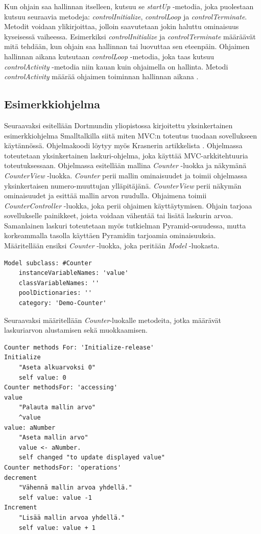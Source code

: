 \documentclass[finnish,utf8,nonumbib,palatino,kandi]{gradu2}
\begin{document}
Kun ohjain saa hallinnan itselleen, kutsuu se \emph{startUp} -metodia, joka puolestaan kutsuu seuraavia metodeja: \emph{controlInitialize}, \emph{controlLoop} ja \emph{controlTerminate}. Metodit
voidaan ylikirjoittaa, jolloin saavutetaan jokin haluttu ominaisuus kyseisessä vaiheessa. Esimerkiksi \emph{controlInitialize} ja \emph{controlTerminate} määräävät mitä tehdään, kun ohjain saa hallinnan tai luovuttaa sen eteenpäin. Ohjaimen hallinnan aikana kutsutaan
\emph{controlLoop} -metodia, joka taas kutsuu \emph{controlActivity} -metodia niin kauan kuin ohjaimella on hallinta.  Metodi \emph{controlActivity} määrää ohjaimen toiminnan hallinnan aikana \cite[s. 9]{Krasner:desc}.

\subsection{Esimerkkiohjelma}
Seuraavaksi esitellään  Dortmundin yliopistossa kirjoitettu yksinkertainen esimerkkiohjelma Smalltalkilla siitä miten MVC:n toteutus tuodaan sovellukseen käytännössä. Ohjelmakoodi löytyy myös Krasnerin artikkelista \cite[s. 20]{Krasner:desc}. Ohjelmassa toteutetaan yksinkertainen laskuri-ohjelma, joka käyttää MVC-arkkitehtuuria toteutuksessaan. Ohjelmassa esitellään mallina \emph{Counter} -luokka ja näkymänä \emph{CounterView} -luokka. \emph{Counter} perii mallin ominaisuudet ja
toimii ohjelmassa yksinkertaisen numero-muuttujan ylläpitäjänä. \emph{CounterView} perii näkymän ominaisuudet ja esittää mallin arvon ruudulla.
Ohjaimena toimii \emph{CounterController} -luokka, joka perii ohjaimen käyttäytymisen. Ohjain tarjoaa sovellukselle painikkeet, joista voidaan vähentää
tai lisätä laskurin arvoa. Samanlainen laskuri toteutetaan myös tutkielman Pyramid-osuudessa, mutta korkeammalla tasolla käyttäen Pyramidin tarjoamia ominaisuuksia.\\

Määritellään ensiksi \emph{Counter} -luokka, joka peritään \emph{Model} -luokasta.
\begin{lstlisting}[language=Smalltalk]
Model subclass: #Counter
	instanceVariableNames: 'value'
	classVariableNames: ''
	poolDictionaries: ''
  	category: 'Demo-Counter'
\end{lstlisting}

Seuraavaksi määritellään \emph{Counter}-luokalle metodeita, jotka määrävät
laskuriarvon alustamisen sekä muokkaamisen.

\begin{lstlisting}[language=Smalltalk]
Counter methods For: 'Initialize-release'
Initialize
	"Aseta alkuarvoksi 0"
	self value: 0
Counter methodsFor: 'accessing'
value
	"Palauta mallin arvo"
   	^value
value: aNumber
	"Aseta mallin arvo"
	value <- aNumber.
	self changed "to update displayed value"
Counter methodsFor: 'operations'
decrement
	"Vähennä mallin arvoa yhdellä."
	self value: value -1
Increment
	"Lisää mallin arvoa yhdellä."
	self value: value + 1
\end{lstlisting}
\end{document}

